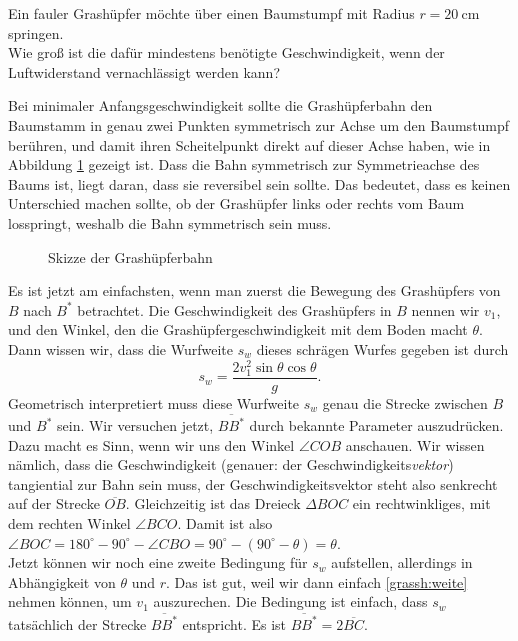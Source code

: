 \begin{Exercise}[label = grassh, title = fauler Grashüpfer, origin = P.Gnädig, difficulty = 5]
	Ein fauler Grashüpfer möchte über einen Baumstumpf mit Radius $r = 20~\mathrm{cm}$ springen.\\
	Wie groß ist die dafür mindestens benötigte Geschwindigkeit, wenn der Luftwiderstand vernachlässigt werden kann?
\end{Exercise}
\begin{Answer}
	Bei minimaler Anfangsgeschwindigkeit sollte die Grashüpferbahn den Baumstamm in genau zwei Punkten symmetrisch zur Achse um den Baumstumpf berühren, und damit ihren Scheitelpunkt direkt auf dieser Achse haben, wie in Abbildung \ref{fig:grasshs} gezeigt ist. Dass die Bahn symmetrisch zur Symmetrieachse des Baums ist, liegt daran, dass sie reversibel sein sollte. Das bedeutet, dass es keinen Unterschied machen sollte, ob der Grashüpfer links oder rechts vom Baum losspringt, weshalb die Bahn symmetrisch sein muss. 
		\begin{figure}[h]
			\centering
			
			\caption{Skizze der Grashüpferbahn}
			\label{fig:grasshs}		
		\end{figure}
	Es ist jetzt am einfachsten, wenn man zuerst die Bewegung des Grashüpfers von $B$ nach $B^{\ast}$ betrachtet. Die Geschwindigkeit des Grashüpfers in $B$ nennen wir $v_1$, und den Winkel, den die Grashüpfergeschwindigkeit mit dem Boden macht $\theta$.\\
	Dann wissen wir, dass die Wurfweite $s_w$ dieses schrägen Wurfes gegeben ist durch
	\begin{equation}\label{grassh:weite}
		s_w = \frac{2 v_1^2 \sin \theta \cos \theta}{g}.
	\end{equation}
	Geometrisch interpretiert muss diese Wurfweite $s_w$ genau die Strecke zwischen $B$ und $B^{\ast}$ sein. Wir versuchen jetzt, $\overline{BB^{\ast}}$ durch bekannte Parameter auszudrücken.\\
	Dazu macht es Sinn, wenn wir uns den Winkel $\angle COB$ anschauen. Wir wissen nämlich, dass die Geschwindigkeit (genauer: der Geschwindigkeits\textit{vektor}) tangiential zur Bahn sein muss, der Geschwindigkeitsvektor steht also senkrecht auf der Strecke $\overline{OB}$. Gleichzeitig ist das Dreieck $\Delta BOC$ ein rechtwinkliges, mit dem rechten Winkel $\angle BCO$. Damit ist also $\angle BOC = 180^\circ-90^\circ-\angle CBO = 90^\circ- \left(90^\circ- \theta\right) = \theta$.\\
	Jetzt können wir noch eine zweite Bedingung für $s_w$ aufstellen, allerdings in Abhängigkeit von $\theta$ und $r$. Das ist gut, weil wir dann einfach \eqref{grassh:weite} nehmen können, um $v_1$ auszurechen. Die Bedingung ist einfach, dass $s_w$ tatsächlich der Strecke $\overline{BB^\ast}$ entspricht. Es ist $\overline{BB^\ast} = 2 \overline{BC}$.\\

\end{Answer}
